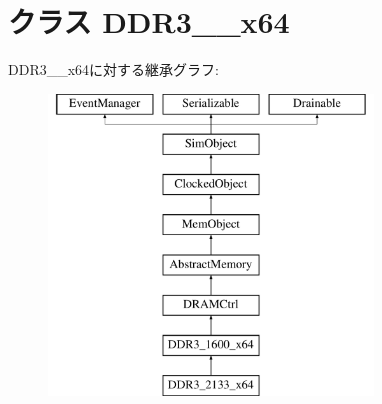 \hypertarget{classDRAMCtrl_1_1DDR3__1600__x64}{
\section{クラス DDR3\_\_\-x64}
\label{classDRAMCtrl_1_1DDR3__1600__x64}
}
DDR3\_\_\-x64に対する継承グラフ:\begin{figure}[H]
\begin{center}
\leavevmode
\includegraphics[height=8cm]{classDRAMCtrl_1_1DDR3__1600__x64}
\end{center}
\end{figure}
